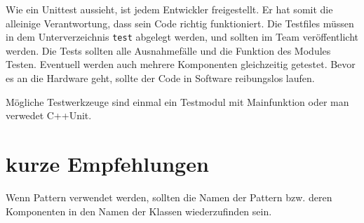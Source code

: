 \documentclass[
   draft=false
  ,paper=a4
  ,twoside=false
  ,fontsize=11pt
  ,headsepline
  ,DIV=11
  ,parskip=full+
  ,titlepage
]{scrartcl} %
\begin{document}
Wie ein Unittest aussieht, ist jedem Entwickler freigestellt. Er hat 
somit die alleinige Verantwortung, dass sein Code richtig funktioniert. 
Die Testfiles müssen in dem Unterverzeichnis \texttt{test} abgelegt werden,
und sollten im Team veröffentlicht werden. 
Die Tests sollten alle Ausnahmefälle und die Funktion des Modules Testen.
Eventuell werden auch mehrere Komponenten gleichzeitig getestet. 
Bevor es an die Hardware geht, sollte der Code in Software reibungslos
laufen.

Mögliche Testwerkzeuge sind einmal ein Testmodul mit Mainfunktion oder 
man verwedet C++Unit.  

\section*{kurze Empfehlungen}
Wenn Pattern verwendet werden, sollten die Namen der Pattern bzw. 
deren Komponenten in den Namen der Klassen wiederzufinden sein. 
\end{document}

